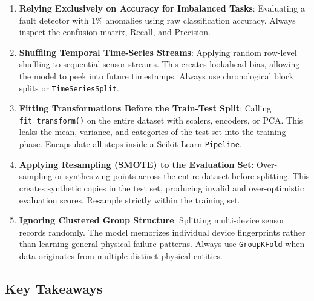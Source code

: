 \begin{warning}
\begin{enumerate}
    \item \textbf{Relying Exclusively on Accuracy for Imbalanced Tasks}:
    Evaluating a fault detector with $1\%$ anomalies using raw classification accuracy. Always inspect the confusion matrix, Recall, and Precision.

    \item \textbf{Shuffling Temporal Time-Series Streams}:
    Applying random row-level shuffling to sequential sensor streams. This creates lookahead bias, allowing the model to peek into future timestamps. Always use chronological block splits or \texttt{TimeSeriesSplit}.

    \item \textbf{Fitting Transformations Before the Train-Test Split}:
    Calling \texttt{fit\_transform()} on the entire dataset with scalers, encoders, or PCA. This leaks the mean, variance, and categories of the test set into the training phase. Encapsulate all steps inside a Scikit-Learn \texttt{Pipeline}.

    \item \textbf{Applying Resampling (SMOTE) to the Evaluation Set}:
    Over-sampling or synthesizing points across the entire dataset before splitting. This creates synthetic copies in the test set, producing invalid and over-optimistic evaluation scores. Resample strictly within the training set.

    \item \textbf{Ignoring Clustered Group Structure}:
    Splitting multi-device sensor records randomly. The model memorizes individual device fingerprints rather than learning general physical failure patterns. Always use \texttt{GroupKFold} when data originates from multiple distinct physical entities.
\end{enumerate}
\end{warning}

\subsection{Key Takeaways}\label{subsec:splitting_takeaways}

